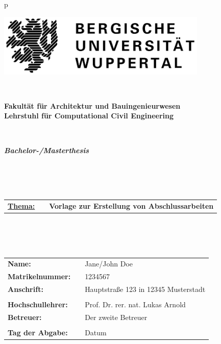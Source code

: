 \begin{center}
\begin{tabular}{p{\textwidth}}


\begin{center}
\includegraphics[width=10cm]{img/Administrativ/BUW_Logo.png}
\end{center}


\\

\begin{center}
\Large{\textsf{\textbf{
Fakultät für Architektur und Bauingenieurwesen\\
Lehrstuhl für Computational Civil Engineering\\
}}}
\end{center}

\\


\begin{center}
	\fontsize{40}{35}
	\textsf{\textbf{\textit{Bachelor-/Masterthesis}}}
\end{center}
\\
\\
\\
\begin{tabular}{llp{12cm}}
	\textsf{\textbf{\Large{\underline{Thema:}}}} & & \textsf{\textbf{\Large{Vorlage zur Erstellung von Abschlussarbeiten}}}
\end{tabular}
\\
\\
\\
\begin{tabular}{lll}
\textsf{\textbf{Name:}} & & \textsf{Jane/John Doe}\\
\textsf{\textbf{Matrikelnummer:}} & & \textsf{1234567}\\
\textsf{\textbf{Anschrift:}} & & \textsf{Hauptstraße 123 in 12345 Musterstadt}\\
 & & \\
\textsf{\textbf{Hochschullehrer:}} & & \textsf{Prof. Dr. rer. nat. Lukas Arnold}\\
\textsf{\textbf{Betreuer:}} & & \textsf{Der zweite Betreuer}\\
 & & \\
\textsf{\textbf{Tag der Abgabe:}} & & \textsf{Datum}\\
\end{tabular}


\end{tabular}
\end{center}